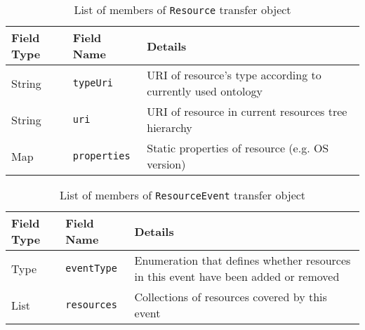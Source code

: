 \begin{table}[ht] %
\begin{tabular}{| m{} | m{} | m{} | }
\hline 
\cellcolor[gray]{0.9} Field Type & \cellcolor[gray]{0.9} Field Name & \cellcolor[gray]{0.9} Details \\
\hline
String & \texttt{typeUri} & URI of resource\rq{}s type according to currently used ontology \\
String & \texttt{uri} & URI of resource in current resources tree hierarchy \\
Map & \texttt{properties} & Static properties of resource (e.g. OS version) \\
\hline 
\end{tabular}
\caption{List of members of \texttt{Resource} transfer object}
\label{tab:TO_Resource}
\end{table} %

\begin{table}[ht] %
\begin{tabular}{| m{} | m{} | m{} | }
\hline 
\cellcolor[gray]{0.9} Field Type & \cellcolor[gray]{0.9} Field Name & \cellcolor[gray]{0.9} Details \\
\hline
Type & \texttt{eventType} & Enumeration that defines whether resources in this event have been added or removed \\
List & \texttt{resources} & Collections of resources covered by this event \\
\hline 
\end{tabular}
\caption{List of members of \texttt{ResourceEvent} transfer object}
\label{tab:TO_ResourceEvent}
\end{table} %
\renewcommand*\arraystretch{1}


